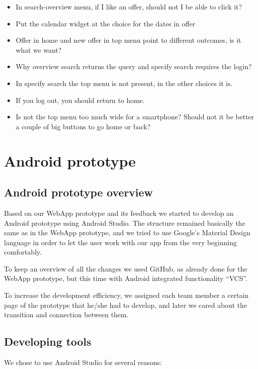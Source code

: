 \documentclass[11pt,twoside,a4paper]{report}
\begin{document}
\begin{itemize}
\item In search-overview menu, if I like an offer, should not I be able to click it?
\item Put the calendar widget at the choice for the dates in offer
\item Offer in home and new offer in top menu point to different outcomes, is it what we want?
\item Why overview search returns the query and specify search requires the login?
\item In specify search the top menu is not present, in the other choices it is.
\item If you log out, you should return to home.
\item Is not the top menu too much wide for a smartphone? Should not it be better a couple of big buttons to go home or back?
\end{itemize}

\chapter{Android prototype}

\section{Android prototype overview}

Based on our WebApp prototype and its feedback we started to develop an Android prototype using Android Studio. The structure remained basically the same as in the WebApp prototype, and we tried to use Google's Material Design language in order to let the user work with our app from the very beginning comfortably.

To keep an overview of all the changes we used GitHub, as already done for the WebApp prototype, but this time with Android integrated functionality ``VCS''.

To increase the development efficiency, we assigned each team member a certain page of the prototype that he/she had to develop, and later we cared about the transition and connection between them.

\section{Developing tools}

We chose to use Android Studio for several reasons:
\end{document}
